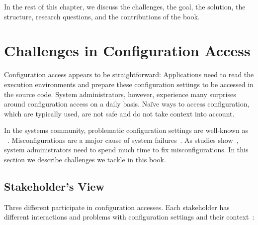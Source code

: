 In the rest of this chapter, we discuss the challenges, the goal, the solution, the structure, research questions, and the contributions of the book.








\section{Challenges in Configuration Access}
\label{sec:introduction-motivation}

Configuration access appears to be straightforward:
Applications need to read the execution environments and prepare these configuration settings to be accessed in the source code.
System administrators, however, experience many surprises around configuration access on a daily basis.
Na\"{i}ve ways to access configuration, which are typically used, are not safe and do not take context into account.


In the systems community, problematic configuration settings are well-known as ~\cite{yin2011empirical,su2007autobash,attariyan2010automating,xu2015systems}.
Misconfigurations are a major cause of system failures~\cite{wool2004quantitative,oppenheimer2003internet,pertet2005causes}.
As studies show~\cite{rabkin2011static,oppenheimer2003internet,yin2011empirical,mahajan2002bgp}, system administrators need to spend much time to fix misconfigurations.
In this section we describe challenges we tackle in this book.


\subsection{Stakeholder's View}

Three different  participate in configuration accesses.
Each stakeholder has different interactions and problems with configuration settings and their context~\cite{raab2017introducing}:

